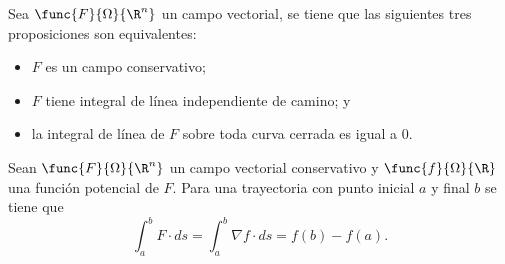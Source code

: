 \documentclass[a4,11pt]{aleph-notas}
\begin{document}
\begin{prop}
    Sea $\func{F}{\Omega}{\R^n}$ un campo vectorial, se tiene que las siguientes tres proposiciones son equivalentes:
    \begin{itemize}
        \item $F$ es un campo conservativo;
        \item $F$ tiene integral de línea independiente de camino; y
        \item la integral de línea de $F$ sobre toda curva cerrada es igual a $0$.
    \end{itemize}
\end{prop}

\begin{teo}
    Sean $\func{F}{\Omega}{\R^n}$ un campo vectorial conservativo y
    $\func{f}{\Omega}{\R}$ una función potencial de $F$. Para una trayectoria con punto inicial $a$ y final $b$ se tiene que
    \[
        \int_a^b F\cdot ds = \int_a^b \nabla f\cdot ds = f(b)-f(a).
    \]
\end{teo}
\end{document}
